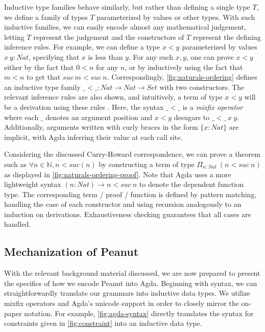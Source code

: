 Inductive type families behave similarly, but rather than defining a single type $T$, we define a family of types $T$ parameterized by values or other types. With such inductive families, we can easily encode almost any mathematical judgement, letting $T$ represent the judgement and the constructors of $T$ represent the defining inference rules. For example, we can define a type $x < y$ parameterized by values $x~y : Nat$, specifying that $x$ is less than $y$. For any such $x, y$, one can prove $x < y$ either by the fact that $0 < n$ for any $n$, or by inductively using the fact that $m < n$ to get that $suc~m < suc~n$. Correspondingly, \autoref{fig:naturals-ordering} defines an inductive type family $\_{<}\_ : Nat \to Nat \to Set$ with two constructors. The relevant inference rules are also shown, and intuitively, a term of type $x < y$ will be a derivation using these rules . Here, the syntax $\_{<}\_$ is a \emph{mixfix operator} where each $\_$ denotes an argument position and $x < y$ desugars to $\_{<}\_~x~y$. Additionally, arguments written with curly braces in the form $\{x : Nat\}$ are implicit, with Agda inferring their value at each call site.



Considering the discussed Curry-Howard correspondence, we can prove a theorem such as $\forall n \in \mathbb{N}, n < suc(n)$ by constructing a term of type $\Pi_{n : Nat}~(n < suc~n)$ as displayed in \autoref{fig:naturals-ordering-proof}. Note that Agda uses a more lightweight syntax $(n : Nat) \to  n < suc~n$ to denote the dependent function type. The corresponding term / proof / function is defined by pattern matching, handling the case of each constructor and using recursion analogously to an induction on derivations. Exhaustiveness checking guarantees that all cases are handled.



\subsection{Mechanization of Peanut}\label{sec:mech-details}
With the relevant background material discussed, we are now prepared to present the specifics of how we encode Peanut into Agda. Beginning with syntax, we can straightforwardly translate our grammars into inductive data types. We utilize mixfix operators and Agda's unicode support in order to closely mirror the on-paper notation. For example, \autoref{fig:agda-syntax} directly translates the syntax for constraints given in \autoref{fig:constraint} into an inductive data type.

